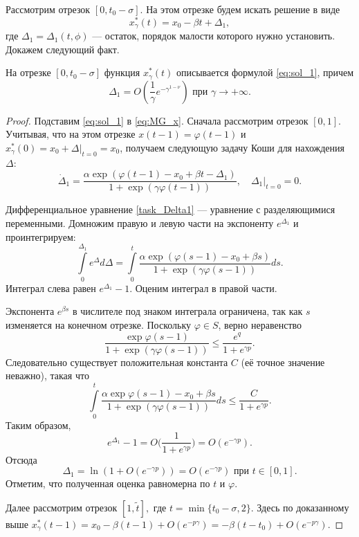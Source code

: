 Рассмотрим отрезок $[0, t_0 - \sigma]$. На этом отрезке будем искать решение в виде
%
\begin{equation}
	\label{eq:sol_1}
	x_\gamma^*(t) = x_0 - \beta t + \Delta_1,
\end{equation}
%
где $\Delta_1 = \Delta_1(t, \phi)$ --- остаток, порядок малости которого нужно установить. Докажем следующий факт.
%
\begin{lemma}
\label{lm:Delta1}
На отрезке $[0, t_0 - \sigma]$ функция $x_\gamma^*(t)$ описывается формулой \eqref{eq:sol_1}, причем
%
\[
\Delta_1 = O\left(\frac{1}{\gamma} e^{-\gamma^{1 - \nu}}\right) \text{ при } \gamma \to +\infty.
\]
\end{lemma}
\begin{proof}
Подставим \eqref{eq:sol_1} в \eqref{eq:MG_x}. Сначала рассмотрим отрезок $[0,1]$. Учитывая, что на этом отрезке $x(t-1) = \varphi(t-1)$ и $x_\gamma^*(0)=x_0 +\Delta|_{t=0}=x_0$, получаем следующую задачу Коши для нахождения $\Delta$: 
\begin{equation}
	\label{task_Delta1}
	\dot{\Delta}_1=\frac{\alpha \exp(\varphi(t-1)-x_0+\beta t-\Delta_1)}{1+\exp(\gamma\varphi(t-1))},\quad \Delta_1|_{t=0}=0.
\end{equation}

Дифференциальное уравнение \eqref{task_Delta1} --- уравнение с разделяющимися переменными. Домножим правую и левую части на экспоненту $e^{\Delta_1}$ и проинтегрируем:
%
\[
\int\limits_0^{\Delta_1} e^\Delta d\Delta=\int\limits_0^t \frac{\alpha \exp(\varphi(s-1) - x_0 + \beta s)}{1 + \exp(\gamma\varphi(s - 1))}ds.
\]
%
Интеграл слева равен $e^{\Delta_1} - 1$. Оценим интеграл в правой части.

Экспонента $e^{\beta s}$ в числителе под знаком интеграла ограничена, так как $s$ изменяется на конечном отрезке. Поскольку $\varphi\in S$, верно неравенство
%
\[
\frac{\exp\varphi(s - 1)}{1 + \exp(\gamma\varphi(s - 1))} \leqslant \frac{e^q}{1 + e^{\gamma p}}.
\]
Следовательно существует положительная константа $C$ (её точное значение неважно), такая что
\[
\int\limits_0^t\frac{\alpha\exp\varphi(s-1)-x_0+\beta s}{1+\exp(\gamma\varphi(s-1))}ds\leqslant\frac{C}{1+e^{\gamma p}}.
\]
%
Таким образом, 
\[
e^{\Delta_1}-1=O\Big(\frac{1}{1+e^{\gamma p}}\Big)=O(e^{-\gamma p}).
\]
Отсюда 
\[
\Delta_1=\ln(1+O(e^{-\gamma p}))=O(e^{-\gamma p}) \text{ при }t\in[0,1].
\]
Отметим, что полученная оценка равномерна по $t$ и $\varphi$.

Далее рассмотрим отрезок $[1, \tilde{t}],$ где $t = \min\{t_0 - \sigma, 2\}$. Здесь по доказанному выше $x_\gamma^*(t-1)=x_0-\beta (t-1)+O(e^{-p\gamma})=-\beta (t-t_0)+O(e^{-p\gamma})$.



\end{proof}
